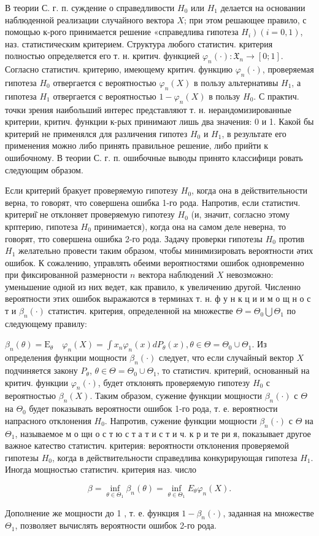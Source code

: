 \documentclass[10pt]{article}
\begin{document}
В теории С. г. п. суждение о справедливости $H_{0}$ или $H_{1}$ делается на основании наблюденной реализации случайного вектора $X$; при этом решающее правило, с помощью к-рого принимается решение «справедлива гипотеза $\left.H_{i}\right)(i=0,1)$, наз. статистическим критерием. Структура любого статистич. критерия полностью определяется его т. н. критич. функцией $\varphi_{n}(\cdot): \mathfrak{X}_{n} \rightarrow[0 ; 1]$. Согласно статистич. критерию, имеющему критич. функцию $\varphi_{n}(\cdot)$, проверяемая гипотеза $H_{0}$ отвергается с вероятностью $\varphi_{n}(X)$ в пользу альтернативы $H_{1}$, а гипотеза $H_{1}$ отвергается с вероятностью $1-\varphi_{n}(X)$ в пользу $H_{0}$. С практич. точки зрения наибольший интерес представляют т. н. нерандомизированные критерии, критич. функции к-рых принимают лишь два значения: 0 и 1. Какой бы критерий не применялся для различения гипотез $H_{0}$ и $H_{1}$, в результате его применения можно либо принять правильное решение, либо прийти к ошибочному. В теории С. г. п. ошибочные выводы принято классифици ровать следующим образом.



Если критерий бракует проверяемую гипотезу $H_{0}$, когда она в действительности верна, то говорят, что совершена ошибка 1-го рода. Напротив, если статистич. критериї̈ не отклоняет проверяемую гипотезу $H_{0}$ (и, значит, согласно этому крптерию, гипотеза $H_{0}$ принимается), когда она на самом деле неверна, то говорят, тто совершена ошибка 2-го рода. Задачу проверки гипотезы $H_{0}$ против $H_{1}$ желательно провести таким образом, чтобы минимизировать вероятности әтих ошибок. К сожалению, управлять обеими вероятностями ошибок одновременно при фиксированной размерности $n$ вектора наблюдений $X$ невозможно: уменьшение одной из них ведет, как правило, к увеличению другой. Численно вероятности этих ошибок выражаются в терминах т. н. ф у н к ц и и м о щ н о с т и $\beta_{n}(\cdot)$ статистич. критерия, определенной на множестве $\Theta=\Theta_{0} \bigcup \Theta_{1}$ по следующему правилу:



$\beta_{n}(\theta)=\mathrm{E}_{\theta} \quad \varphi_{n}(X)=\int x_{n} \varphi_{n}(x) d P_{\theta}(x), \theta \in \Theta=\Theta_{0} \cup \Theta_{1}$. Из определения функции мощности $\beta_{n}(\cdot)$ следует, что если случайный вектор $X$ подчиняется закону $P_{\theta}$, $\theta \in \Theta=\Theta_{0} \cup \Theta_{1}$, то статистич. критерий, основанный на критич. функции $\varphi_{n}(\cdot)$, будет отклонять проверяемую гипотезу $H_{0}$ с вероятностью $\beta_{n}(X)$. Таким образом, сужение функции мощности $\beta_{n}(\cdot)$ с $\Theta$ на $\Theta_{0}$ будет показывать вероятности ошибок 1-го рода, т. е. вероятности напрасного отклонения $H_{0}$. Напротив, сужение функции мощности $\beta_{n}(\cdot)$ с $\Theta$ на $\Theta_{1}$, называемое м о щн о с т ю с т а т и с т и ч. к р и те ри я, показывает другое важное катество статистич. критерия: вероятности отклонения проверяемой гипотезы $H_{0}$, когда в действительности справедлива конкурирующая гипотеза $H_{1}$. Иногда мощностью статистич. критерия наз. число



\[

\beta=\inf _{\theta \in \Theta_{1}} \beta_{n}(\theta)=\inf _{\theta \in \Theta_{1}} E_{\theta} \varphi_{n}(X) .

\]



Дополнение же мощности до 1 , т. е. функция $1-\beta_{n}(\cdot)$, заданная на множестве $\Theta_{1}$, позволяет вычислять вероятности ошибок 2-го рода.
\end{document}
